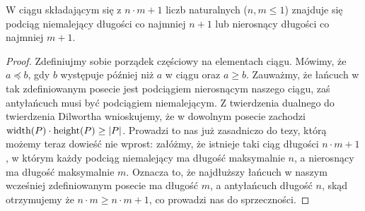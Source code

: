 \begin{theorem}
	W ciągu składającym się z \(n \cdot m + 1\) liczb naturalnych (\(n,m \leq 1\)) znajduje
	się podciąg niemalejący długości co najmniej \(n + 1\) lub nierosnący długości co najmniej
	\(m + 1\).
\end{theorem}

\begin{proof}
	Zdefiniujmy sobie porządek częściowy na elementach ciągu. Mówimy, że \(a \preceq b\),
	gdy \(b\) występuje później niż \(a\) w ciągu oraz \(a \geq b\). Zauważmy, że łańcuch w
	tak zdefiniowanym posecie jest podciągiem nierosnącym naszego ciągu, zaś antyłańcuch
	musi być podciągiem niemalejącym.
	Z twierdzenia dualnego do twierdzenia Dilwortha wnioskujemy, że w dowolnym posecie
	zachodzi \(\posetwidth(P) \cdot \posetheight(P) \geq \card{P}\).
	Prowadzi to nas już zasadniczo do tezy, którą możemy teraz dowieść nie wprost:
	załóżmy, że istnieje taki ciąg długości \(n \cdot m + 1\), w którym każdy podciąg
	niemalejący ma długość maksymalnie \(n\), a nierosnący ma długość maksymalnie \(m\).
	Oznacza to, że najdłuższy łańcuch w naszym wcześniej zdefiniowanym
	posecie ma długość \(m\), a antyłańcuch długość \(n\), skąd otrzymujemy że
	\(n \cdot m \geq n \cdot m + 1\), co prowadzi nas do sprzeczności.
\end{proof}

